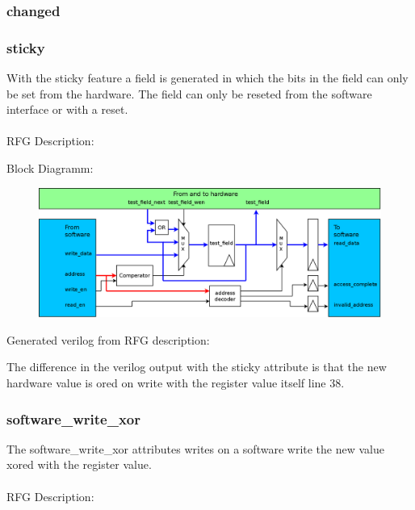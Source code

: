 \documentclass[12pt,a4paper]{article}
\begin{document}
\subsubsection{changed}
\newpage

\subsubsection{sticky}
With the sticky feature a field is generated in which the bits in the field can only be set from the hardware. The field can only be reseted from the software interface or with a reset.\\
\\
RFG Description:


Block Diagramm:
\begin{figure}[h!]
    \includegraphics[width=\textwidth]{pictures/Reg_hrw_srw_sticky.png}
\end{figure}
\newpage
Generated verilog from RFG description:

The difference in the verilog output with the sticky attribute is that the new hardware value is ored on write with the register value itself line 38.
\newpage

\subsubsection{software\_write\_xor}
The software\_write\_xor attributes writes on a software write the new value xored with the register value.\\
\\
RFG Description:

\end{document}
